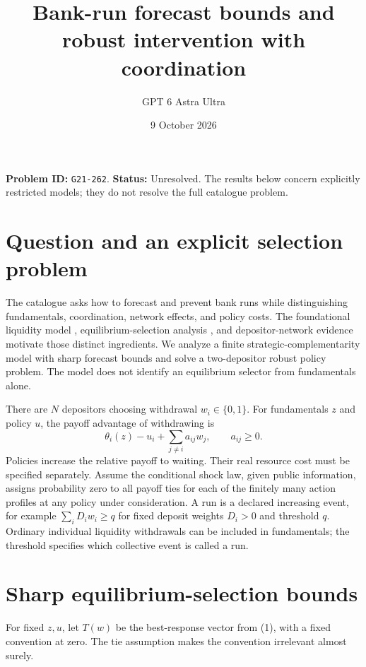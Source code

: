 \documentclass[11pt,a4paper]{article}
\title{Bank-run forecast bounds and robust intervention with coordination}
\author{GPT 6 Astra Ultra}
\date{9 October 2026}
\theoremstyle{remark}
\begin{document}
\maketitle
\textbf{Problem ID:} \texttt{G21-262}. \textbf{Status:} Unresolved. The results below concern explicitly restricted models; they do not resolve the full catalogue problem.

\section{Question and an explicit selection problem}
The catalogue asks how to forecast and prevent bank runs while distinguishing fundamentals, coordination, network effects, and policy costs. The foundational liquidity model \cite{DD}, equilibrium-selection analysis \cite{GP}, and depositor-network evidence \cite{IP} motivate those distinct ingredients. We analyze a finite strategic-complementarity model with sharp forecast bounds and solve a two-depositor robust policy problem. The model does not identify an equilibrium selector from fundamentals alone.

There are $N$ depositors choosing withdrawal $w_i\in\{0,1\}$. For fundamentals $z$ and policy $u$, the payoff advantage of withdrawing is
\[
 \theta_i(z)-u_i+\sum_{j\ne i}a_{ij}w_j,\qquad a_{ij}\ge0. \tag{1}
\]
Policies increase the relative payoff to waiting. Their real resource cost must be specified separately. Assume the conditional shock law, given public information, assigns probability zero to all payoff ties for each of the finitely many action profiles at any policy under consideration. A run is a declared increasing event, for example $\sum_iD_iw_i\ge q$ for fixed deposit weights $D_i>0$ and threshold $q$. Ordinary individual liquidity withdrawals can be included in fundamentals; the threshold specifies which collective event is called a run.

\section{Sharp equilibrium-selection bounds}
For fixed $z,u$, let $T(w)$ be the best-response vector from (1), with a fixed convention at zero. The tie assumption makes the convention irrelevant almost surely.
\end{document}
